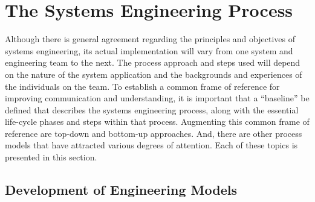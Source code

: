 \section{The Systems Engineering Process}

Although there is general agreement regarding the principles and objectives of systems engineering, its actual implementation will vary from one system and engineering team to the next. The process approach and steps used will depend on the nature of the system application and the backgrounds and experiences of the individuals on the team. To establish a common frame of reference for improving communication and understanding, it is important that a “baseline” be defined that describes the systems engineering process, along with the essential life-cycle phases and steps within that process. Augmenting this common frame of reference are top-down and bottom-up approaches. And, there are other process models that have attracted various degrees of attention. Each of these topics is presented in this section.

\subsection{Development of Engineering Models}

